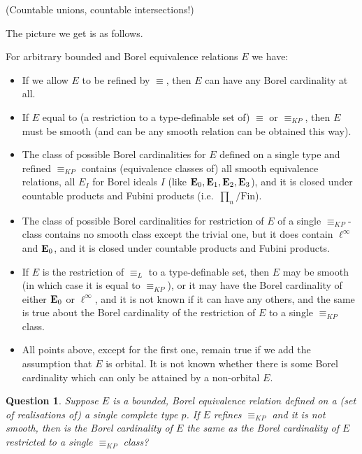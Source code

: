 \documentclass[final,a4paper,12pt]{amsart}
\newtheorem{qu}[con]{Question}
\theoremstyle{remark}
\theoremstyle{definition}
\newcommand{\Fin}{\textrm{Fin}}
\newcommand{\Laseq}{\mathrel{\equiv_L}}
\newcommand{\KPeq}{\mathrel{\equiv_{KP}}}
\begin{document}
	(Countable unions, countable intersections!)
	
	The picture we get is as follows.
	
	For arbitrary bounded and Borel equivalence relations $E$ we have:
	\begin{itemize}
		\item
		If we allow $E$ to be refined by $\equiv$, then $E$ can have any Borel cardinality at all.
		\item
		If $E$ equal to (a restriction to a type-definable set of) $\equiv$ or $\KPeq$, then $E$ must be smooth (and can be any smooth relation can be obtained this way).
		\item
		The class of possible Borel cardinalities for $E$ defined on a single type and refined $\KPeq$ contains (equivalence classes of) all smooth equivalence relations, all $E_I$ for Borel ideals $I$ (like ${\bf E}_0,{\bf E}_1,{\bf E}_2,{\bf E}_3$), and it is closed under countable products and Fubini products (i.e.\ $\prod_n/\Fin$).
		\item
		The class of possible Borel cardinalities for restriction of $E$ of a single $\KPeq$-class contains no smooth class except the trivial one, but it does contain $\ell^\infty$ and ${\bf E}_0$, and it is closed under countable products and Fubini products.
		\item
		If $E$ is the restriction of ${\Laseq}$ to a type-definable set, then $E$ may be smooth (in which case it is equal to $\KPeq$), or it may have the Borel cardinality of either ${\bf E}_0$ or $\ell^\infty$, and it is not known if it can have any others, and the same is true about the Borel cardinality of the restriction of $E$ to a single ${\KPeq}$ class.
		\item
		All points above, except for the first one, remain true if we add the assumption that $E$ is orbital. It is not known whether there is some Borel cardinality which can only be attained by a non-orbital $E$.
	\end{itemize}
	
	\begin{qu}
		Suppose $E$ is a bounded, Borel equivalence relation defined on a (set of realisations of) a single complete type $p$. If $E$ refines $\KPeq$ and it is not smooth, then is the Borel cardinality of $E$ the same as the Borel cardinality of $E$ restricted to a single ${\KPeq}$ class?
	\end{qu}
	
	
	
	
\end{document}
